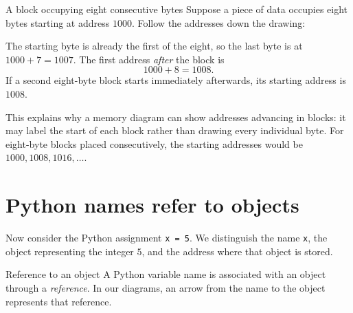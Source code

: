 \documentclass[a4paper,12pt,oneside]{report}
\begin{document}
\begin{framedexample}{A block occupying eight consecutive bytes}
Suppose a piece of data occupies eight bytes starting at address
$1000$. Follow the addresses down the drawing:
\begin{center}
\end{center}
The starting byte is already the first of the eight, so the last
byte is at $1000+7=1007$. The first address \emph{after} the block is
\[
  1000+8=\boxed{1008}.
\]
If a second eight-byte block starts immediately afterwards, its
starting address is $1008$.
\end{framedexample}

This explains why a memory diagram can show addresses advancing in
blocks: it may label the start of each block rather than drawing
every individual byte. For eight-byte blocks placed consecutively,
the starting addresses would be $1000,1008,1016,\ldots$.

\section{Python names refer to objects}

Now consider the Python assignment \texttt{x = 5}. We distinguish
the name \texttt{x}, the object representing the integer $5$, and
the address where that object is stored.

\begin{frameddefn}{Reference to an object}\label{def:object-reference}
A Python variable name is associated with an object through a
\emph{reference}. In our diagrams, an arrow from the name to the
object represents that reference.
\end{frameddefn}
\end{document}
